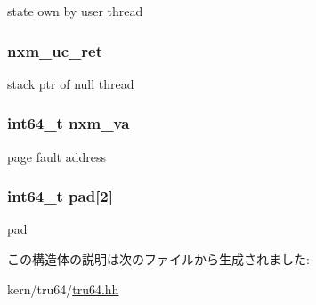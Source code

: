 state own by user thread \hypertarget{structTru64_1_1nxm__sched__state_a2321cce735687222b55d66da9530112f}{
\subsubsection[{nxm\_\-uc\_\-ret}]{ {\bf nxm\_\-uc\_\-ret}}}
\label{structTru64_1_1nxm__sched__state_a2321cce735687222b55d66da9530112f}


stack ptr of null thread \hypertarget{structTru64_1_1nxm__sched__state_ae84de29884ab739a856f7a85c13a55c2}{
\subsubsection[{nxm\_\-va}]{\setlength{\rightskip}{0pt plus 5cm}int64\_\-t {\bf nxm\_\-va}}}
\label{structTru64_1_1nxm__sched__state_ae84de29884ab739a856f7a85c13a55c2}


page fault address \hypertarget{structTru64_1_1nxm__sched__state_ab80989b0e8ced8520cd836ae8dcd588c}{
\subsubsection[{pad}]{\setlength{\rightskip}{0pt plus 5cm}int64\_\-t {\bf pad}\mbox{[}2\mbox{]}}}
\label{structTru64_1_1nxm__sched__state_ab80989b0e8ced8520cd836ae8dcd588c}


pad 

この構造体の説明は次のファイルから生成されました:\begin{DoxyCompactItemize}
\item 
kern/tru64/\hyperlink{kern_2tru64_2tru64_8hh}{tru64.hh}\end{DoxyCompactItemize}

